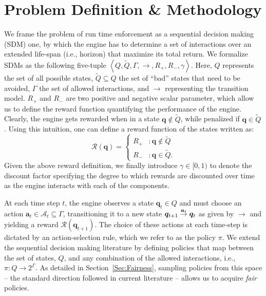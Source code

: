 \section{Problem Definition \& Methodology }
We frame the problem of run time enforcement as a sequential decision making (SDM) one, by which the engine has to determine a set of interactions over an extended life-span (i.e., horizon) that maximize its total return. We formalize SDMs as the following five-tuple $\left \langle Q, \tilde{Q},\Gamma, \rightarrow, {R}_{+}, {R}_{-}, \gamma \right\rangle$. Here, $Q$ represents the set of all possible states, $\tilde{Q} \subseteq Q$ the set of ``bad'' states that need to be avoided, $\Gamma$ the set of allowed interactions, and $\rightarrow$ representing the transition model. $R_{+}$ and ${R}_{-}$ are two positive and negative scalar parameter, which allow us to define the reward function quantifying the performance of the engine. Clearly, the engine gets rewarded when in a state $\bm{q} \notin \tilde{Q}$, while penalized if $\bm{q} \in \tilde{Q}$. Using this intuition, one can define a reward function of the states written as: 
   \begin{displaymath}
   \mathcal{R}(\bm{q}) = \left\{
     \begin{array}{lr}
       R_{+} & :  \bm{q} \notin \tilde{Q} \\
       R_{-} & : \bm{q} \in \tilde{Q}.
     \end{array}
   \right.
\end{displaymath} 
Given the above reward definition, we finally introduce $\gamma \in [0,1)$ to denote the discount factor specifying the degree to which rewards are discounted over time as the engine interacts with each of the components. 


At each time step $t$, the engine observes a state $\bm{q}_{t} \in Q$ and must choose an action $\bm{a}_{t} \in \mathcal{A}_{t} \subseteq \Gamma$, transitioning it to a new state $\bm{q}_{t+1} \goesto[\bm{a}_{t}]\bm{q}_{t}$ as given by $\rightarrow$ and yielding a reward $\mathcal{R}\left(\bm{q}_{t+1}\right)$. The choice of these actions at each time-step is dictated by an action-selection rule, which we refer to as the policy $\pi$. We extend the sequential decision making literature by defining policies that map between the set of states, $Q$, and any combination of the allowed interactions, i.e., $\pi: Q \rightarrow 2^{\Gamma}$. As detailed in Section~\ref{Sec:Fairness}, sampling policies from this space -- the standard direction followed in current literature -- allows us to acquire \emph{fair} policies. 


